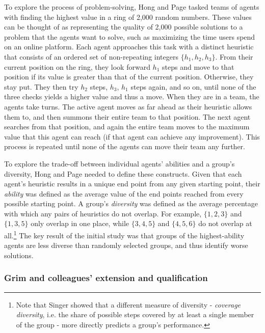 To explore the process of problem-solving, Hong and Page tasked teams of agents with finding the highest value in a ring of 2,000 random numbers. These values can be thought of as representing the quality of 2,000 possible solutions to a problem that the agents want to solve, such as maximizing the time users spend on an online platform. Each agent approaches this task with a distinct heuristic that consists of an ordered set of non-repeating integers $\{h_{1}, h_{2}, h_{3}\}$. From their current position on the ring, they look forward $h_{1}$ steps and move to that position if its value is greater than that of the current position. Otherwise, they stay put. They then try $h_{2}$ steps, $h_{3}$, $h_{1}$ steps again, and so on, until none of the three checks yields a higher value and thus a move. When they are in a team, the agents take turns. The active agent moves as far ahead as their heuristic allows them to, and then summons their entire team to that position. The next agent searches from that position, and again the entire team moves to the maximum value that this agent can reach (if that agent can achieve any improvement). This process is repeated until none of the agents can move their team any further.

To explore the trade-off between individual agents' abilities and a group's diversity, Hong and Page needed to define these constructs. Given that each agent's heuristic results in a unique end point from any given starting point, their \emph{ability} was defined as the average value of the end points reached from every possible starting point. A group's \emph{diversity} was defined as the average percentage with which any pairs of heuristics do not overlap. For example, $\{1, 2, 3\}$ and $\{1, 3, 5\}$ only overlap in one place, while $\{3, 4, 5\}$ and $\{4, 5, 6\}$ do not overlap at all.\footnote{Note that Singer\supercite{singer2019diversity} showed that a different measure of diversity - \emph{coverage diversity}, i.e. the share of possible steps covered by at least a single member of the group - more directly predicts a group's performance.} The key result of the initial study was that groups of the highest-ability agents are less diverse than randomly selected groups, and thus identify worse solutions.

\subsubsection{Grim and colleagues' extension and qualification}

